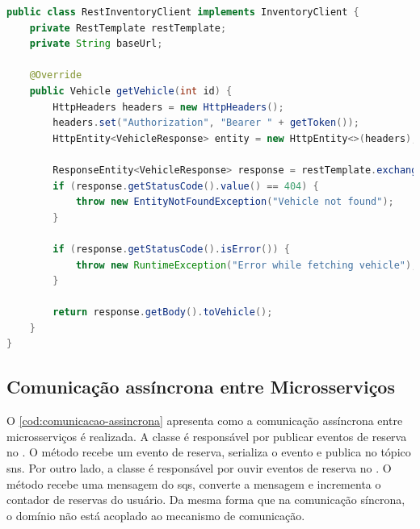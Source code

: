 \begin{codigo}[H]
    \begin{lstlisting}[language=Java]
public class RestInventoryClient implements InventoryClient {
    private RestTemplate restTemplate;
    private String baseUrl;

    @Override
    public Vehicle getVehicle(int id) {
        HttpHeaders headers = new HttpHeaders();
        headers.set("Authorization", "Bearer " + getToken());
        HttpEntity<VehicleResponse> entity = new HttpEntity<>(headers);

        ResponseEntity<VehicleResponse> response = restTemplate.exchange(baseUrl + "/vehicles/{id}", HttpMethod.GET, entity, VehicleResponse.class, id);
        if (response.getStatusCode().value() == 404) {
            throw new EntityNotFoundException("Vehicle not found");
        }

        if (response.getStatusCode().isError()) {
            throw new RuntimeException("Error while fetching vehicle");
        }

        return response.getBody().toVehicle();
    }
}
    \end{lstlisting}
    \caption{Método para obter um veículo do }
    \label{cod:rest-inventory-client}
\end{codigo}

\subsection{Comunicação assíncrona entre Microsserviços}
O \autoref{cod:comunicacao-assincrona} apresenta como a comunicação assíncrona entre microsserviços é realizada. A classe  é responsável por publicar eventos de reserva no . O método  recebe um evento de reserva, serializa o evento e publica no tópico \acrshort{sns}. Por outro lado, a classe  é responsável por ouvir eventos de reserva no . O método  recebe uma mensagem do \acrshort{sqs}, converte a mensagem e incrementa o contador de reservas do usuário. Da mesma forma que na comunicação síncrona, o domínio não está acoplado ao mecanismo de comunicação.

